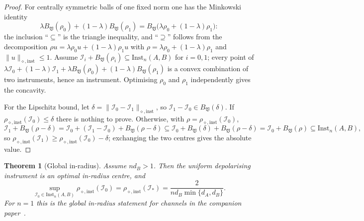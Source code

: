 \documentclass[11pt,a4paper]{article}
\newtheorem{theorem}{Theorem}[section]
\newcommand{\Inst}{\mathrm{Inst}}
\begin{document}
\begin{proof}
For centrally symmetric balls of one fixed norm one has the Minkowski identity
\[
\lambda B_{\mathfrak V}(\rho_0)+(1-\lambda)B_{\mathfrak V}(\rho_1)
=B_{\mathfrak V}\big(\lambda\rho_0+(1-\lambda)\rho_1\big):
\]
the inclusion ``$\subseteq$'' is the triangle inequality, and ``$\supseteq$'' follows from the decomposition $\rho u=\lambda\rho_0u+(1-\lambda)\rho_1u$ with $\rho=\lambda\rho_0+(1-\lambda)\rho_1$ and $\|u\|_{\diamond,\mathrm{inst}}\le1$. Assume $\mathcal I_i+B_{\mathfrak V}(\rho_i)\subseteq\Inst_n(A,B)$ for $i=0,1$; every point of $\lambda\mathcal I_0+(1-\lambda)\mathcal I_1+\lambda B_{\mathfrak V}(\rho_0)+(1-\lambda)B_{\mathfrak V}(\rho_1)$ is a convex combination of two instruments, hence an instrument. Optimising $\rho_0$ and $\rho_1$ independently gives the concavity.

For the Lipschitz bound, let $\delta=\|\mathcal I_0-\mathcal I_1\|_{\diamond,\mathrm{inst}}$, so $\mathcal I_1-\mathcal I_0\in B_{\mathfrak V}(\delta)$. If $\rho_{\diamond,\mathrm{inst}}(\mathcal I_0)\le\delta$ there is nothing to prove. Otherwise, with $\rho=\rho_{\diamond,\mathrm{inst}}(\mathcal I_0)$,
\[
\mathcal I_1+B_{\mathfrak V}(\rho-\delta)
=\mathcal I_0+(\mathcal I_1-\mathcal I_0)+B_{\mathfrak V}(\rho-\delta)
\subseteq\mathcal I_0+B_{\mathfrak V}(\delta)+B_{\mathfrak V}(\rho-\delta)
=\mathcal I_0+B_{\mathfrak V}(\rho)
\subseteq\Inst_n(A,B),
\]
so $\rho_{\diamond,\mathrm{inst}}(\mathcal I_1)\ge\rho_{\diamond,\mathrm{inst}}(\mathcal I_0)-\delta$; exchanging the two centres gives the absolute value.
\end{proof}

\begin{theorem}[Global in-radius]
\label{thm:global-inradius}
Assume $nd_B>1$. Then the uniform depolarising instrument is an optimal in-radius centre, and
\[
\sup_{\mathcal I_0\in\Inst_n(A,B)}\rho_{\diamond,\mathrm{inst}}(\mathcal I_0)
=\rho_{\diamond,\mathrm{inst}}(\mathcal I_*)
=\frac{2}{nd_B\min\{d_A,d_B\}}.
\]
For $n=1$ this is the global in-radius statement for channels in the companion paper~\cite{CompanionChannels}.
\end{theorem}
\end{document}
